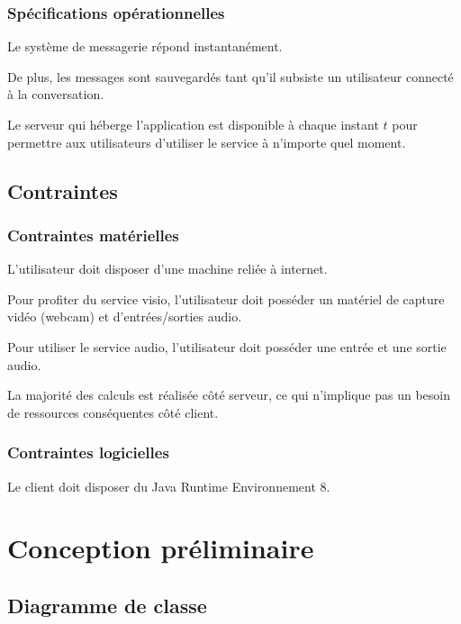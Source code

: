 \documentclass[11pt,dvipsnames,svgnames]{report}
\begin{document}
\subsection{Spécifications opérationnelles}

Le système de messagerie répond instantanément.

De plus, les messages sont sauvegardés tant qu'il subsiste un utilisateur connecté à la conversation.

Le serveur qui héberge l'application est disponible à chaque instant $t$ pour permettre aux utilisateurs d'utiliser le service à n'importe quel moment.

\section{Contraintes}
\subsection{Contraintes matérielles}
L'utilisateur doit disposer d'une machine reliée à internet.

Pour profiter du service visio, l'utilisateur doit posséder un matériel de capture vidéo (webcam) et d'entrées/sorties audio.

Pour utiliser le service audio, l'utilisateur doit posséder une entrée et une sortie audio.

La majorité des calculs est réalisée côté serveur, ce qui n'implique pas un besoin de ressources conséquentes côté client.

\subsection{Contraintes logicielles}

Le client doit disposer du Java Runtime Environnement 8.

\chapter{Conception préliminaire}

\section{Diagramme de classe}
\end{document}
